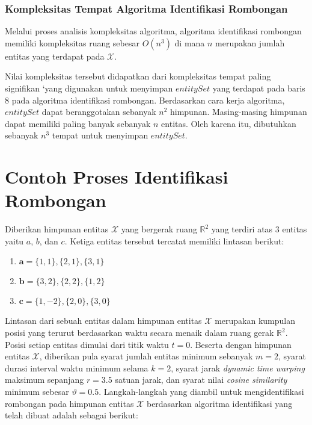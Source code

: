 \subsubsection{Kompleksitas Tempat Algoritma Identifikasi Rombongan}
\label{subsubsec:space-complexity}

Melalui proses analisis kompleksitas algoritma, algoritma identifikasi rombongan memiliki kompleksitas ruang sebesar $O(n^3)$ di mana $n$ merupakan jumlah entitas yang terdapat pada $\mathcal{X}$.

Nilai kompleksitas tersebut didapatkan dari kompleksitas tempat paling signifikan `yang digunakan untuk menyimpan $entitySet$ yang terdapat pada baris $8$ pada algoritma identifikasi rombongan. Berdasarkan cara kerja algoritma, $entitySet$ dapat beranggotakan sebanyak $n^2$ himpunan. Masing-masing himpunan dapat memiliki paling banyak sebanyak $n$ entitas. Oleh karena itu, dibutuhkan sebanyak $n^3$ tempat untuk menyimpan $entitySet$. 

\section{Contoh Proses Identifikasi Rombongan}
\label{sec:algorithm-example}

Diberikan himpunan entitas $\mathcal{X}$ yang bergerak ruang $\mathbb{R}^2$ yang terdiri atas 3 entitas yaitu $a$, $b$, dan $c$. Ketiga entitas tersebut tercatat memiliki lintasan berikut:

\begin{enumerate}
    \item $\textbf{a} = \{ 1, 1 \}, \{ 2, 1 \}, \{ 3, 1 \}$
    \item $\textbf{b} = \{ 3, 2 \}, \{ 2, 2 \}, \{ 1, 2 \}$
    \item $\textbf{c} = \{ 1, -2 \}, \{ 2, 0 \}, \{ 3, 0 \}$
\end{enumerate}

Lintasan dari sebuah entitas dalam himpunan entitas $\mathcal{X}$ merupakan kumpulan posisi yang terurut berdasarkan waktu secara menaik dalam ruang gerak $\mathbb{R}^2$. Posisi setiap entitas dimulai dari titik waktu $t = 0$. Beserta dengan himpunan entitas $\mathcal{X}$, diberikan pula syarat jumlah entitas minimum sebanyak $m = 2$, syarat durasi interval waktu minimum selama $k = 2$, syarat jarak \textit{dynamic time warping} maksimum sepanjang $r = 3.5$ satuan jarak, dan syarat nilai \textit{cosine similarity} minimum sebesar $\vartheta = 0.5$. Langkah-langkah yang diambil untuk mengidentifikasi rombongan pada himpunan entitas $\mathcal{X}$ berdasarkan algoritma identifikasi yang telah dibuat adalah sebagai berikut:

